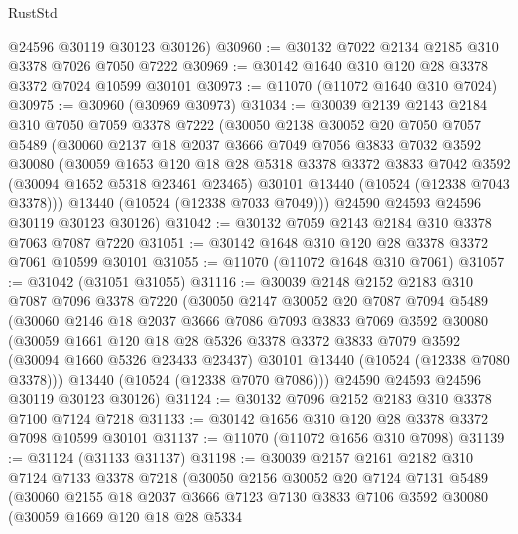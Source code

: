\begin{lexlean}{RustStd}
\begin{coremodule}
      @24596
      @30119
      @30123
      @30126)
@30960 := @30132 @7022 @2134 @2185 @310 @3378 @7026 @7050 @7222
@30969 := @30142 @1640 @310 @120 @28 @3378 @3372 @7024 @10599 @30101
@30973 := @11070 (@11072 @1640 @310 @7024)
@30975 := @30960 (@30969 @30973)
@31034 := @30039
    @2139
    @2143
    @2184
    @310
    @7050
    @7059
    @3378
    @7222
    (@30050
      @2138
      @30052
      @20
      @7050
      @7057
      @5489
      (@30060
        @2137
        @18
        @2037
        @3666
        @7049
        @7056
        @3833
        @7032
        @3592
        @30080
        (@30059
          @1653
          @120
          @18
          @28
          @5318
          @3378
          @3372
          @3833
          @7042
          @3592
          (@30094 @1652 @5318 @23461 @23465)
          @30101
          @13440
          (@10524 (@12338 @7043 @3378)))
        @13440
        (@10524 (@12338 @7033 @7049)))
      @24590
      @24593
      @24596
      @30119
      @30123
      @30126)
@31042 := @30132 @7059 @2143 @2184 @310 @3378 @7063 @7087 @7220
@31051 := @30142 @1648 @310 @120 @28 @3378 @3372 @7061 @10599 @30101
@31055 := @11070 (@11072 @1648 @310 @7061)
@31057 := @31042 (@31051 @31055)
@31116 := @30039
    @2148
    @2152
    @2183
    @310
    @7087
    @7096
    @3378
    @7220
    (@30050
      @2147
      @30052
      @20
      @7087
      @7094
      @5489
      (@30060
        @2146
        @18
        @2037
        @3666
        @7086
        @7093
        @3833
        @7069
        @3592
        @30080
        (@30059
          @1661
          @120
          @18
          @28
          @5326
          @3378
          @3372
          @3833
          @7079
          @3592
          (@30094 @1660 @5326 @23433 @23437)
          @30101
          @13440
          (@10524 (@12338 @7080 @3378)))
        @13440
        (@10524 (@12338 @7070 @7086)))
      @24590
      @24593
      @24596
      @30119
      @30123
      @30126)
@31124 := @30132 @7096 @2152 @2183 @310 @3378 @7100 @7124 @7218
@31133 := @30142 @1656 @310 @120 @28 @3378 @3372 @7098 @10599 @30101
@31137 := @11070 (@11072 @1656 @310 @7098)
@31139 := @31124 (@31133 @31137)
@31198 := @30039
    @2157
    @2161
    @2182
    @310
    @7124
    @7133
    @3378
    @7218
    (@30050
      @2156
      @30052
      @20
      @7124
      @7131
      @5489
      (@30060
        @2155
        @18
        @2037
        @3666
        @7123
        @7130
        @3833
        @7106
        @3592
        @30080
        (@30059
          @1669
          @120
          @18
          @28
          @5334

\end{coremodule}
\end{lexlean}
